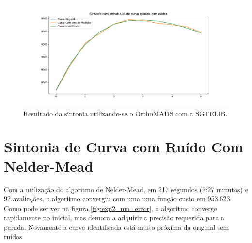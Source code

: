 \begin{figure}[H]
\centering
  \includegraphics[width=1\linewidth]{figs/curva_sg.pdf}
  \caption{Resultado da sintonia utilizando-se o OrthoMADS com a SGTELIB.}
  \label{fig:exp2_sg_curve}
\end{figure}


\section{Sintonia de Curva com Ruído Com Nelder-Mead}

Com a utilização do algoritmo de Nelder-Mead, em 217 segundos (3:27 minutos) e 92 avaliações, o algoritmo convergiu com uma uma função custo em 953.623. Como pode ser ver na figura \ref{fig:exp2_nm_error}, o algoritmo converge rapidamente no inicial, mas demora a adquirir a precisão requerida para a parada. Novamente a curva identificada está muito próxima da original sem ruídos.



